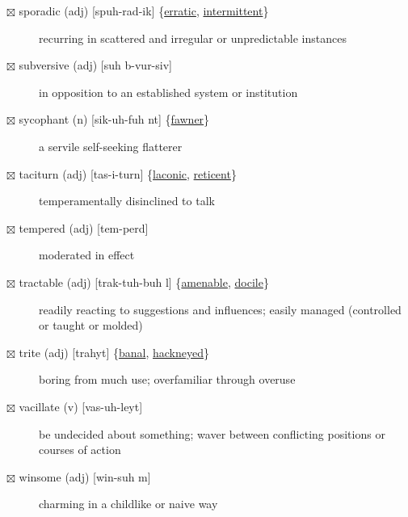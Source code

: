 \documentclass[11pt]{article}
\begin{document}
\begin{description}
\item[{$\boxtimes$ \label{org154a341}sporadic (adj) [spuh-rad-ik] \{\hyperref[orgdb07f06]{erratic}, \hyperref[orgc65316b]{intermittent}\}}] recurring in scattered and irregular or unpredictable instances
\item[{$\boxtimes$ subversive (adj) [suh b-vur-siv]}] in opposition to an established system or institution
\item[{$\boxtimes$ \label{orgd5a859e} sycophant (n) [sik-uh-fuh nt] \{\hyperref[orgaf85d33]{fawner}\}}] a servile self-seeking flatterer
\item[{$\boxtimes$ \label{orgbeffa4e}taciturn (adj) [tas-i-turn] \{\hyperref[orgb49cb86]{laconic}, \hyperref[orgb962b96]{reticent}\}}] temperamentally disinclined to talk
\item[{$\boxtimes$ tempered (adj) [tem-perd]}] moderated in effect
\item[{$\boxtimes$ \label{org8bff33c}tractable (adj) [trak-tuh-buh l] \{\hyperref[orgfe6eaea]{amenable}, \hyperref[orgee81bd2]{docile}\}}] readily reacting to suggestions and influences; easily managed (controlled or taught or molded)
\item[{$\boxtimes$ \label{org91e02d4}trite (adj) [trahyt] \{\hyperref[orgf0ea999]{banal}, \hyperref[org3731f44]{hackneyed}\}}] boring from much use; overfamiliar through overuse
\item[{$\boxtimes$ vacillate (v) [vas-uh-leyt]}] be undecided about something; waver between conflicting positions or courses of action
\item[{$\boxtimes$ winsome (adj) [win-suh m]}] charming in a childlike or naive way
\end{description}
\end{document}
